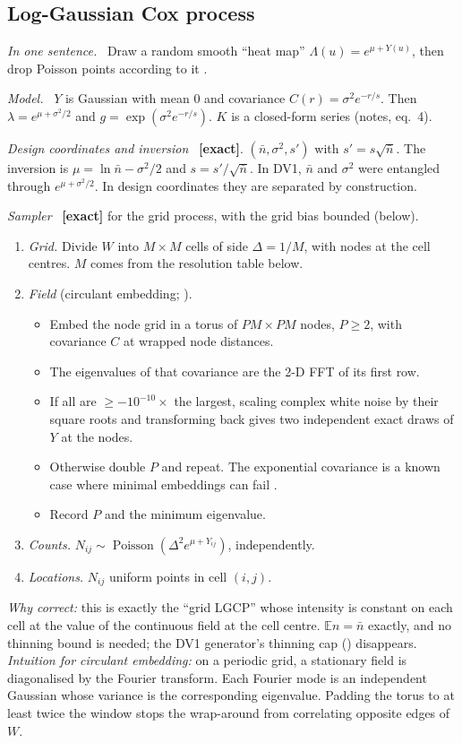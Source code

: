 \documentclass[10pt,a4paper]{article}
\newcommand{\code}[1]{\texttt{\detokenize{#1}}}
\newcommand{\exact}{\textcolor{green!45!black}{\textbf{[exact]}}}
\newcommand{\nbar}{\bar n}
\newcommand{\Pois}{\operatorname{Poisson}}
\newcommand{\E}{\mathbb{E}}
\newcommand{\sub}[1]{\par\textit{#1}\ }
\begin{document}
\subsection{Log-Gaussian Cox process}\label{sec:lgcp}
\sub{In one sentence.} Draw a random smooth ``heat map'' $\Lambda(u)=e^{\mu+Y(u)}$, then drop Poisson points according to it \citep{Moller1998}.
\sub{Model.} $Y$ is Gaussian with mean $0$ and covariance $C(r)=\sigma^2e^{-r/s}$. Then $\lambda=e^{\mu+\sigma^2/2}$ and $g=\exp(\sigma^2e^{-r/s})$. $K$ is a closed-form series (notes, eq.~4).
\sub{Design coordinates and inversion} \exact. $(\nbar,\sigma^2,s')$ with $s'=s\sqrt{\nbar}$. The inversion is $\mu=\ln\nbar-\sigma^2/2$ and $s=s'/\sqrt{\nbar}$. In DV1, $\nbar$ and $\sigma^2$ were entangled through $e^{\mu+\sigma^2/2}$. In design coordinates they are separated by construction.
\sub{Sampler} \exact{} for the grid process, with the grid bias bounded (below).
\begin{enumerate}
  \item \emph{Grid.} Divide $W$ into $M\times M$ cells of side $\Delta=1/M$, with nodes at the cell centres. $M$ comes from the resolution table below.
  \item \emph{Field} (circulant embedding; \citealp{WoodChan1994,DietrichNewsam1997}).
  \begin{itemize}
    \item Embed the node grid in a torus of $PM\times PM$ nodes, $P\ge2$, with covariance $C$ at wrapped node distances.
    \item The eigenvalues of that covariance are the 2-D FFT of its first row.
    \item If all are $\ge-10^{-10}\times$ the largest, scaling complex white noise by their square roots and transforming back gives two independent exact draws of $Y$ at the nodes.
    \item Otherwise double $P$ and repeat. The exponential covariance is a known case where minimal embeddings can fail \citep{Gneiting2006}.
    \item Record $P$ and the minimum eigenvalue.
  \end{itemize}
  \item \emph{Counts.} $N_{ij}\sim\Pois(\Delta^2e^{\mu+Y_{ij}})$, independently.
  \item \emph{Locations.} $N_{ij}$ uniform points in cell $(i,j)$.
\end{enumerate}
\emph{Why correct:} this is exactly the ``grid LGCP'' whose intensity is constant on each cell at the value of the continuous field at the cell centre. $\E n=\nbar$ exactly, and no thinning bound is needed; the DV1 generator's thinning cap (\code{cox.py:150-158}) disappears. \emph{Intuition for circulant embedding:} on a periodic grid, a stationary field is diagonalised by the Fourier transform. Each Fourier mode is an independent Gaussian whose variance is the corresponding eigenvalue. Padding the torus to at least twice the window stops the wrap-around from correlating opposite edges of $W$.
\end{document}
